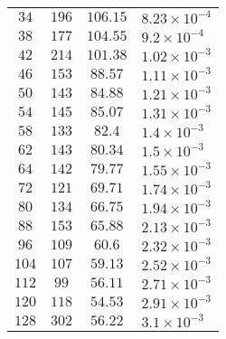 \documentclass[]{article}
\begin{document}
\begin{table}
\begin{tabular}{|c | c | c | l |}
		$34$ & $196$ & $106.15$ & $8.23\times 10^{-4}$ \\ 
		$38$ & $177$ & $104.55$ & $9.2\times 10^{-4}$ \\ 
		$42$ & $214$ & $101.38$ & $1.02\times 10^{-3}$ \\ 
		$46$ & $153$ & $88.57$ & $1.11\times 10^{-3}$ \\ 
		$50$ & $143$ & $84.88$ & $1.21\times 10^{-3}$ \\ 
		$54$ & $145$ & $85.07$ & $1.31\times 10^{-3}$ \\ 
		$58$ & $133$ & $82.4$ & $1.4\times 10^{-3}$ \\ 
		$62$ & $143$ & $80.34$ & $1.5\times 10^{-3}$ \\ 
		$64$ & $142$ & $79.77$ & $1.55\times 10^{-3}$ \\ 
		$72$ & $121$ & $69.71$ & $1.74\times 10^{-3}$ \\ 
		$80$ & $134$ & $66.75$ & $1.94\times 10^{-3}$ \\ 
		$88$ & $153$ & $65.88$ & $2.13\times 10^{-3}$ \\ 
		$96$ & $109$ & $60.6$ & $2.32\times 10^{-3}$ \\ 
		$104$ & $107$ & $59.13$ & $2.52\times 10^{-3}$ \\ 
		$112$ & $99$ & $56.11$ & $2.71\times 10^{-3}$ \\ 
		$120$ & $118$ & $54.53$ & $2.91\times 10^{-3}$ \\ 
		$128$ & $302$ & $56.22$ & $3.1\times 10^{-3}$ \\  
		\hline  
	\end{tabular}
\end{table}
\end{document}
